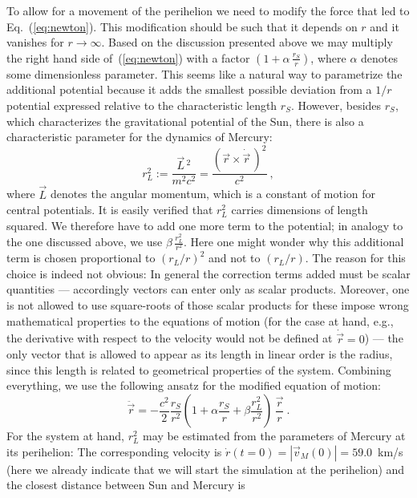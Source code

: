 \documentclass[12pt,ngerman,american]{iopart}
\newcommand{\abs}[1]{\left\vert #1 \right\vert}
\begin{document}
To allow for a movement of the perihelion we need to modify the force that led to Eq.~(\ref{eq:newton}).
This modification should be such that it depends on $r$ and it vanishes for $r\to \infty$.
Based on the discussion presented above we may multiply the right hand side of~(\ref{eq:newton}) with a factor
$(1+\alpha \, \frac{r_S}{r} )$, where $\alpha$ denotes some dimensionless parameter.
This seems like a natural way to parametrize the additional potential because it adds the smallest possible deviation from a $1/r$ potential expressed relative to the characteristic length $r_S$.
However, besides $r_S$, which characterizes the gravitational potential of the Sun, there is also a characteristic parameter for the dynamics of Mercury:
\begin{equation}
r_L^2 := \frac{\vec L\,^2}{m^2c^2}= \frac{{(\vec r\times \dot{\vec r} \, )}^2}{c^2} \ , \label{a2def}
\end{equation}
where $\vec L$ denotes the angular momentum, which is a constant of motion for central potentials.
It is easily verified that $r_L^2$ carries dimensions of length squared.
We therefore have to add one more term to the potential; in analogy to the one discussed above, we use $\beta \, \frac{r_L^2}{r^2}$.
Here one might wonder why this additional term is chosen proportional to $(r_L/r)^2$ and not to $(r_L/r)$. The reason for this choice
is indeed not obvious: In general the correction terms added must be scalar quantities --- accordingly vectors can enter only
as scalar products. Moreover, one is not allowed to use square-roots of those scalar products for these impose
wrong mathematical properties to the equations of motion (for the case at hand, e.g., the derivative with
respect to the velocity would not be defined at $\dot{\vec r}=0$) --- the only vector that is allowed to appear as its length in linear order
is the radius, since this length is related to geometrical properties of the system.
Combining everything, we use the following ansatz for the modified equation of motion:
\begin{equation}
\ddot{\vec r} = - \frac{c^2}{2}\frac{r_S}{r^2}\left(1+\alpha\frac{r_S}{r}+\beta\frac{r_L^2}{r^2}\right) \, \frac{\vec{r}}{r} \ .
\label{eq:newton_art}
\end{equation}
For the system at hand, $r_L^2$ may be estimated from the parameters of Mercury at its perihelion: The corresponding velocity is
 $\dot{ r}(t=0)=\abs{\vec v_M(0)} = 59.0$~km/s (here we already indicate that we will start the simulation at the perihelion) and the closest distance between Sun and Mercury is
\end{document}
